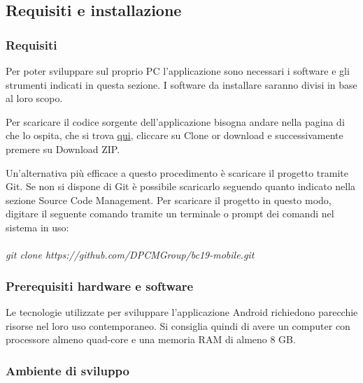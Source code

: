 \subsection{Requisiti e installazione}

\subsubsection{Requisiti}
Per poter sviluppare sul proprio PC l'applicazione sono necessari i software e gli strumenti indicati in questa sezione. I software da installare saranno divisi in base al loro scopo.

Per scaricare il codice sorgente dell'applicazione bisogna andare nella pagina di  che lo ospita, che si trova \href{https://github.com/DPCMGroup/bc19-mobile}{qui}, cliccare su Clone or download e successivamente premere su Download ZIP.

Un'alternativa più efficace a questo procedimento è scaricare il progetto tramite Git. Se non si dispone di Git è possibile scaricarlo seguendo quanto indicato nella sezione Source Code Management. Per scaricare il progetto in questo modo, digitare il seguente comando tramite un terminale o prompt dei comandi nel sistema in uso:\\ \\
\textit{git clone https://github.com/DPCMGroup/bc19-mobile.git}

\subsubsection{Prerequisiti hardware e software}
Le tecnologie utilizzate per sviluppare l'applicazione Android richiedono parecchie risorse nel loro uso contemporaneo. Si consiglia quindi di avere un computer con processore almeno quad-core e una memoria RAM di almeno 8 GB.

\subsubsection{Ambiente di sviluppo}

